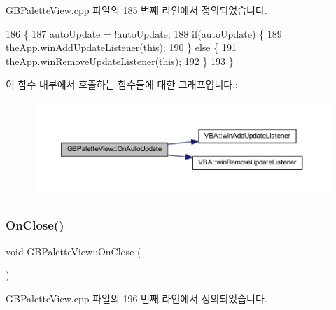 G\+B\+Palette\+View.\+cpp 파일의 185 번째 라인에서 정의되었습니다.


\begin{DoxyCode}
186 \{
187   autoUpdate = !autoUpdate;
188   \textcolor{keywordflow}{if}(autoUpdate) \{
189     \mbox{\hyperlink{_v_b_a_8cpp_a8095a9d06b37a7efe3723f3218ad8fb3}{theApp}}.\mbox{\hyperlink{class_v_b_a_af0712f70a90d023ab8327a366be08174}{winAddUpdateListener}}(\textcolor{keyword}{this});
190   \} \textcolor{keywordflow}{else} \{
191     \mbox{\hyperlink{_v_b_a_8cpp_a8095a9d06b37a7efe3723f3218ad8fb3}{theApp}}.\mbox{\hyperlink{class_v_b_a_a2d31a0656df2230310aa8dc9e3a735d3}{winRemoveUpdateListener}}(\textcolor{keyword}{this});    
192   \}  
193 \}
\end{DoxyCode}
이 함수 내부에서 호출하는 함수들에 대한 그래프입니다.\+:
\nopagebreak
\begin{figure}[H]
\begin{center}
\leavevmode
\includegraphics[width=350pt]{class_g_b_palette_view_a8d2c0e66a90accbbe35b286a51857728_cgraph}
\end{center}
\end{figure}
\mbox{\label{class_g_b_palette_view_a7cbc4954d55851e0991ee4419904fcec}} 
\subsubsection{\texorpdfstring{On\+Close()}{OnClose()}}
{\footnotesize\ttfamily void G\+B\+Palette\+View\+::\+On\+Close (\begin{DoxyParamCaption}{ }\end{DoxyParamCaption})\hspace{0.3cm}{\ttfamily [protected]}}



G\+B\+Palette\+View.\+cpp 파일의 196 번째 라인에서 정의되었습니다.



